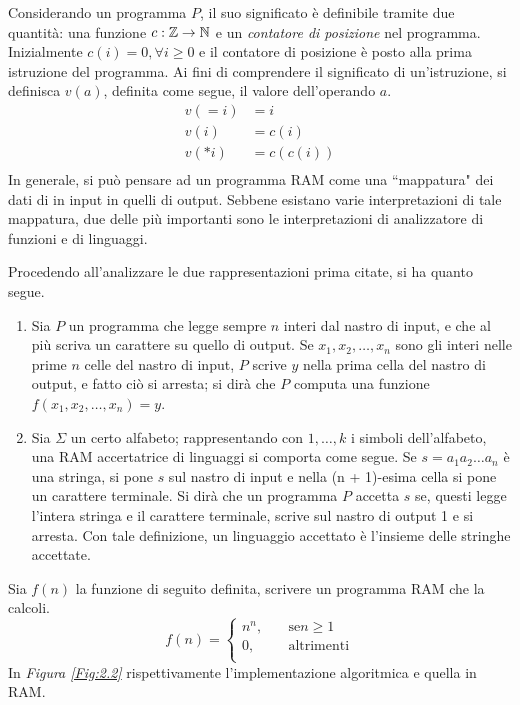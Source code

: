 \documentclass{subfiles}
\begin{document}
\noindent Considerando un programma \(P\), il suo significato è definibile tramite due quantità: una funzione \(c : \mathbb{Z} \to \mathbb{N}\) e un \emph{contatore di posizione} nel programma. \\
Inizialmente \(c(i) = 0, \forall i \ge 0\) e il contatore di posizione è posto alla prima istruzione del programma.
Ai fini di comprendere il significato di un'istruzione, si definisca \(v(a)\), definita come segue, il valore dell'operando \(a\).
\[\begin{aligned}
        v(=i) & = i       \\
        v(i)  & = c(i)    \\
        v(*i) & = c(c(i)) \\
    \end{aligned}\]
\noindent In generale, si può pensare ad un programma RAM come una ``mappatura" dei dati di in input in quelli di output.
Sebbene esistano varie interpretazioni di tale mappatura, due delle più importanti sono le interpretazioni di analizzatore di funzioni e di linguaggi.
\clearpage

\noindent Procedendo all'analizzare le due rappresentazioni prima citate, si ha quanto segue.
\begin{enumerate}
    \item Sia \(P\) un programma che legge sempre \(n\) interi dal nastro di input, e che al più scriva un carattere su quello di output.
          Se \(x_{1}, x_{2}, \ldots, x_{n}\) sono gli interi nelle prime \(n\) celle del nastro di input, \(P\) scrive \(y\) nella prima cella del nastro di output, e fatto ciò si arresta;
          si dirà che \(P\) computa una funzione \(f(x_{1}, x_{2}, \ldots, x_{n}) = y\).

    \item Sia \(\Sigma\) un certo alfabeto; rappresentando con \(1, \ldots, k\) i simboli dell'alfabeto, una RAM accertatrice di linguaggi si comporta come segue.
          Se \(s = a_{1} a_{2} \ldots a_{n}\) è una stringa, si pone \(s\) sul nastro di input e nella (n + 1)-esima cella si pone un carattere terminale.
          Si dirà che un programma \(P\) accetta \(s\) se, questi legge l'intera stringa e il carattere terminale, scrive sul nastro di output 1 e si arresta.
          Con tale definizione, un linguaggio accettato è l'insieme delle stringhe accettate.
\end{enumerate}

\begin{Example*}
    Sia \(f(n)\) la funzione di seguito definita, scrivere un programma RAM che la calcoli.
    \[f(n) = \begin{cases}
            n^{n}, \quad & \text{se} n \ge 1 \\
            0, \quad     & \text{altrimenti} \\
        \end{cases}\]
    \noindent In \emph{Figura \ref{Fig:2.2}} rispettivamente l'implementazione algoritmica e quella in RAM.
    

\end{Example*}
\end{document}
